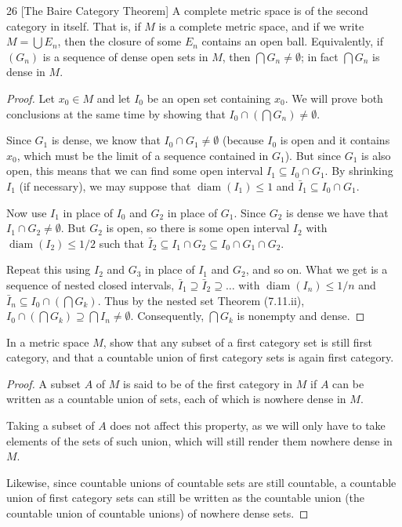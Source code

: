 \begin{exercise}{26 [The Baire Category Theorem]}
A complete metric space is of the second category in itself.
That is, if $M$ is a complete metric space, and if we write $M = \bigcup E_n$, then the closure of some $E_n$ contains an open ball.
Equivalently, if $(G_n)$ is a sequence of dense open sets in $M$, then $\bigcap G_n \neq \emptyset$;
in fact $\bigcap G_n$ is dense in $M$.
\end{exercise}
\begin{proof}
Let $x_0 \in M$ and let $I_0$ be an open set containing $x_0$.
We will prove both conclusions at the same time by showing that $I_0 \cap (\bigcap G_n) \neq \emptyset$.

Since $G_1$ is dense, we know that $I_0 \cap G_1 \neq \emptyset$ (because $I_0$ is open and it contains $x_0$, which must be the limit of a sequence contained in $G_1$).
But since $G_1$ is also open, this means that we can find some open interval $I_1 \subseteq I_0 \cap G_1$.
By shrinking $I_1$ (if necessary), we may suppose that $\operatorname{diam}(I_1) \leq 1$ and $\bar{I}_1 \subseteq I_0 \cap G_1$.

Now use $I_1$ in place of $I_0$ and $G_2$ in place of $G_1$.
Since $G_2$ is dense we have that $I_1 \cap G_2 \neq \emptyset$.
But $G_2$ is open, so there is some open interval $I_2$ with $\operatorname{diam}(I_2) \leq 1/2$ such that $\bar{I}_2 \subseteq I_1 \cap G_2 \subseteq I_0 \cap G_1 \cap G_2$.

Repeat this using $I_2$ and $G_3$ in place of $I_1$ and $G_2$, and so on.
What we get is a sequence of nested closed intervals, $\bar{I}_1 \supseteq \bar{I}_2 \supseteq \dots$ with $\operatorname{diam}(I_n) \leq 1/n$ and $\bar{I}_n \subseteq I_0 \cap (\bigcap G_k)$.
Thus by the nested set Theorem (7.11.ii), $I_0 \cap (\bigcap G_k) \supseteq \bigcap I_n \neq \emptyset$. 
Consequently, $\bigcap G_k$ is nonempty and dense.
\end{proof} 

\begin{exercise}{28}
In a metric space $M$, show that any subset of a first category set is still first category, and that a countable union of first category sets is again first category.
\end{exercise}
\begin{proof}
A subset $A$ of $M$ is said to be of the first category in $M$ if $A$ can be written as a countable union of sets, each of which is nowhere dense in $M$.

Taking a subset of $A$ does not affect this property, as we will only have to take elements of the sets of such union, which will still render them nowhere dense in $M$.

Likewise, since countable unions of countable sets are still countable, a countable union of first category sets can still be written as the countable union (the countable union of countable unions) of nowhere dense sets.
\end{proof} 

